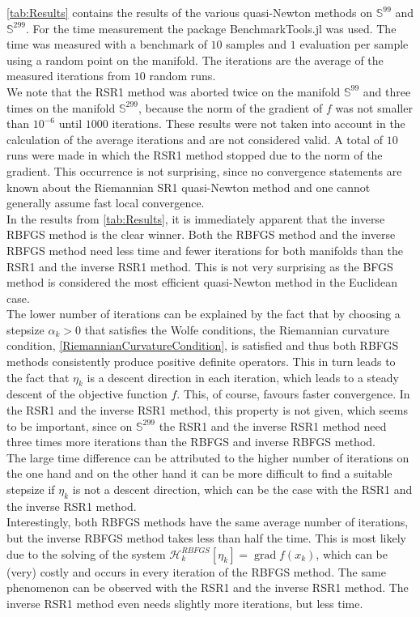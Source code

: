 \cref{tab:Results} contains the results of the various quasi-Newton methods on $\mathbb{S}^{99}$ and $\mathbb{S}^{299}$. For the time measurement the package BenchmarkTools.jl was used. The time was measured with a benchmark of $10$ samples and $1$ evaluation per sample using a random point on the manifold. The iterations are the average of the measured iterations from $10$ random runs. \\
We note that the RSR1 method was aborted twice on the manifold $\mathbb{S}^{99}$ and three times on the manifold $\mathbb{S}^{299}$, because the norm of the gradient of $f$ was not smaller than $10^{-6}$ until $1000$ iterations. These results were not taken into account in the calculation of the average iterations and are not considered valid. A total of $10$ runs were made in which the RSR1 method stopped due to the norm of the gradient. This occurrence is not surprising, since no convergence statements are known about the Riemannian SR1 quasi-Newton method and one cannot generally assume fast local convergence. \\
In the results from \cref{tab:Results}, it is immediately apparent that the inverse RBFGS method is the clear winner. Both the RBFGS method and the inverse RBFGS method need less time and fewer iterations for both manifolds than the RSR1 and the inverse RSR1 method. This is not very surprising as the BFGS method is considered the most efficient quasi-Newton method in the Euclidean case. \\
The lower number of iterations can be explained by the fact that by choosing a stepsize $\alpha_k > 0$ that satisfies the Wolfe conditions, the Riemannian curvature condition, \cref{RiemannianCurvatureCondition}, is satisfied and thus both RBFGS methods consistently produce positive definite operators. This in turn leads to the fact that $\eta_k$ is a descent direction in each iteration, which leads to a steady descent of the objective function $f$. This, of course, favours faster convergence. In the RSR1 and the inverse RSR1 method, this property is not given, which seems to be important, since on $\mathbb{S}^{299}$ the RSR1 and the inverse RSR1 method need three times more iterations than the RBFGS and inverse RBFGS method. \\
The large time difference can be attributed to the higher number of iterations on the one hand and on the other hand it can be more difficult to find a suitable stepsize if $\eta_k$ is not a descent direction, which can be the case with the RSR1 and the inverse RSR1 method. \\
Interestingly, both RBFGS methods have the same average number of iterations, but the inverse RBFGS method takes less than half the time. This is most likely due to the solving of the system $\mathcal{H}^{RBFGS}_k [\eta_k] = \operatorname{grad} f(x_k)$, which can be (very) costly and occurs in every iteration of the RBFGS method. The same phenomenon can be observed with the RSR1 and the inverse RSR1 method. The inverse RSR1 method even needs slightly more iterations, but less time.

